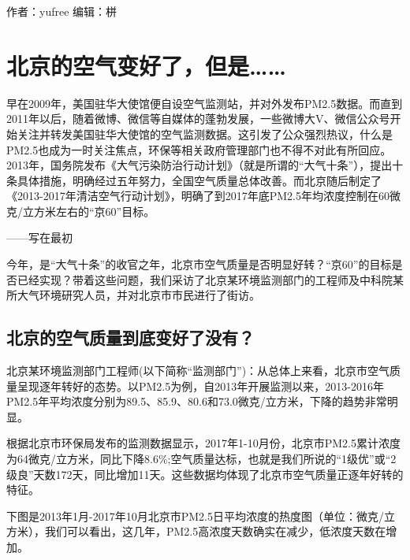 \documentclass[]{book}
\begin{document}
作者：yufree
编辑：栟

\hypertarget{ux5317ux4eacux7684ux7a7aux6c14ux53d8ux597dux4e86ux4f46ux662f}{%
\section{北京的空气变好了，但是\ldots{}\ldots{}}\label{ux5317ux4eacux7684ux7a7aux6c14ux53d8ux597dux4e86ux4f46ux662f}}

早在2009年，美国驻华大使馆便自设空气监测站，并对外发布PM2.5数据。而直到2011年以后，随着微博、微信等自媒体的蓬勃发展，一些微博大V、微信公众号开始关注并转发美国驻华大使馆的空气监测数据。这引发了公众强烈热议，什么是PM2.5也成为一时关注焦点，环保等相关政府管理部门也不得不对此有所回应。2013年，国务院发布《大气污染防治行动计划》（就是所谓的``大气十条''），提出十条具体措施，明确经过五年努力，全国空气质量总体改善。而北京随后制定了《2013-2017年清洁空气行动计划》，明确了到2017年底PM2.5年均浓度控制在60微克/立方米左右的``京60''目标。

------写在最初

今年，是``大气十条''的收官之年，北京市空气质量是否明显好转？``京60''的目标是否已经实现？带着这些问题，我们采访了北京某环境监测部门的工程师及中科院某所大气环境研究人员，并对北京市市民进行了街访。

\hypertarget{ux5317ux4eacux7684ux7a7aux6c14ux8d28ux91cfux5230ux5e95ux53d8ux597dux4e86ux6ca1ux6709}{%
\subsection{北京的空气质量到底变好了没有？}\label{ux5317ux4eacux7684ux7a7aux6c14ux8d28ux91cfux5230ux5e95ux53d8ux597dux4e86ux6ca1ux6709}}

北京某环境监测部门工程师(以下简称``监测部门'')：从总体上来看，北京市空气质量呈现逐年转好的态势。以PM2.5为例，自2013年开展监测以来，2013-2016年PM2.5年平均浓度分别为89.5、85.9、80.6和73.0微克/立方米，下降的趋势非常明显。

根据北京市环保局发布的监测数据显示，2017年1-10月份，北京市PM2.5累计浓度为64微克/立方米，同比下降8.6\%;空气质量达标，也就是我们所说的``1级优''或``2级良''天数172天，同比增加11天。这些数据均体现了北京市空气质量正逐年好转的特征。

下图是2013年1月-2017年10月北京市PM2.5日平均浓度的热度图（单位：微克/立方米），我们可以看出，这几年，PM2.5高浓度天数确实在减少，低浓度天数在增加。
\end{document}

